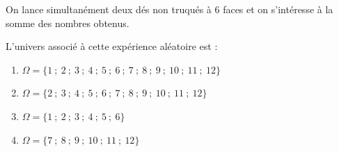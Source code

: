 \begin{exo}
	On lance simultanément deux dés non truqués à $6$ faces et on s'intéresse à la somme des nombres obtenus.

	L'univers associé à cette expérience aléatoire est :
	\begin{enumerate}
		\item $\Omega = \{1~;~2~;~3~;~4~;~5~;~6~;~7~;~8~;~9~;~10~;~11~;~12\}$
		\item $\Omega = \{2~;~3~;~4~;~5~;~6~;~7~;~8~;~9~;~10~;~11~;~12\}$
		\item $\Omega = \{1~;~2~;~3~;~4~;~5~;~6\}$
		\item $\Omega = \{7~;~8~;~9~;~10~;~11~;~12\}$
	\end{enumerate}
\end{exo}
